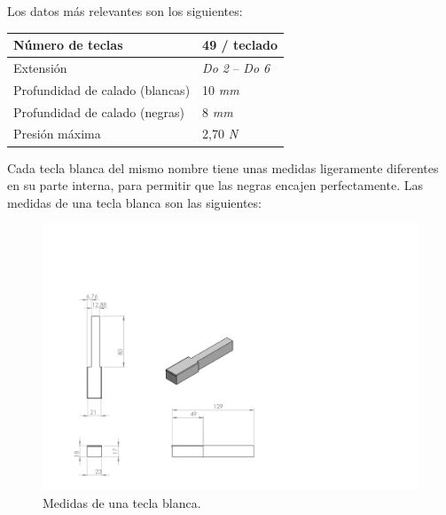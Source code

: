 
Los datos más relevantes son los siguientes:

\smallskip

\begin{center}
	\begin{tabular}{|l|l|}
		\hline Número de teclas & 49 / teclado \\
		\hline Extensión & \textit{Do 2} -- \textit{Do 6} \\
		\hline Profundidad de calado (blancas) & 10 \textit{mm} \\
		\hline Profundidad de calado (negras) & 8 \textit{mm} \\
		\hline Presión máxima & 2,70 \textit{N} \\
		\hline
	\end{tabular}
	\smallskip
\end{center}

\smallskip

Cada tecla blanca del mismo nombre tiene unas medidas ligeramente diferentes en su parte interna, para permitir que las negras encajen perfectamente. Las medidas de una tecla blanca son las siguientes:

\smallskip

\begin{figure}[H]
	\noindent \begin{centering}
		\includegraphics[clip=true,trim=0 0 360 150, width=\linewidth/2]{capitulo3/blanca_modelo}
		\par\end{centering}
	\smallskip
	\caption{\label{fig:blanca_modelo} Medidas de una tecla blanca.}
\end{figure} 

